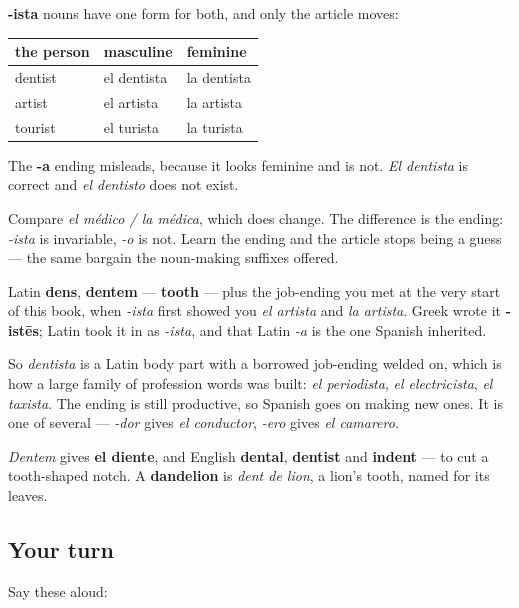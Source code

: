 \begin{grammarlens}[title={Grammar Lens: -ista does not change for gender}]
\textbf{-ista} nouns have one form for both, and only the article moves:

\noindent
\begin{tabularx}{\linewidth}{@{}>{\raggedright\arraybackslash}X>{\raggedright\arraybackslash}X>{\raggedright\arraybackslash}X@{}}
\toprule
\textbf{the person} & \textbf{masculine} & \textbf{feminine} \\
\midrule
dentist & el dentista & la dentista \\
artist & el artista & la artista \\
tourist & el turista & la turista \\
\bottomrule
\end{tabularx}

The \textbf{-a} ending misleads, because it looks feminine and is not. \emph{El dentista} is correct and \emph{el dentisto} does not exist.

Compare \emph{el médico / la médica}, which does change. The difference is the ending: \emph{-ista} is invariable, \emph{-o} is not. Learn the ending and the article stops being a guess — the same bargain the noun-making suffixes offered.
\end{grammarlens}

\begin{cousinweb}
Latin \textbf{dens}, \textbf{dentem} — \textbf{tooth} — plus the job-ending you met at the very start of this book, when \emph{-ista} first showed you \emph{el artista} and \emph{la artista}. Greek wrote it \textbf{-istēs}; Latin took it in as \emph{-ista}, and that Latin \emph{-a} is the one Spanish inherited.

So \emph{dentista} is a Latin body part with a borrowed job-ending welded on, which is how a large family of profession words was built: \emph{el periodista}, \emph{el electricista}, \emph{el taxista}. The ending is still productive, so Spanish goes on making new ones. It is one of several — \emph{-dor} gives \emph{el conductor}, \emph{-ero} gives \emph{el camarero}.

\emph{Dentem} gives \textbf{el diente}, and English \textbf{dental}, \textbf{dentist} and \textbf{indent} — to cut a tooth-shaped notch. A \textbf{dandelion} is \emph{dent de lion}, a lion's tooth, named for its leaves.
\end{cousinweb}

\subsection*{Your turn}
Say these aloud:


